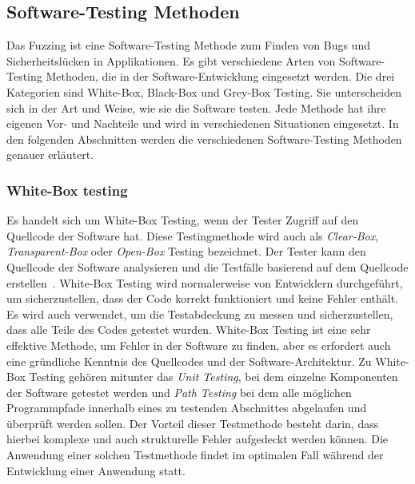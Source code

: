 
\subsection{Software-Testing Methoden}\label{subsec:software-testing-methoden}
Das Fuzzing ist eine Software-Testing Methode zum Finden von Bugs und Sicherheitslücken in Applikationen.
Es gibt verschiedene Arten von Software-Testing Methoden, die in der Software-Entwicklung eingesetzt werden.
Die drei Kategorien sind White-Box, Black-Box und Grey-Box Testing.
Sie unterscheiden sich in der Art und Weise, wie sie die Software testen.
Jede Methode hat ihre eigenen Vor- und Nachteile und wird in verschiedenen Situationen eingesetzt.
In den folgenden Abschnitten werden die verschiedenen Software-Testing Methoden genauer erläutert.
\subsubsection{White-Box testing}\label{subsubsec:white-box-testing}
Es handelt sich um White-Box Testing, wenn der Tester Zugriff auf den Quellcode der Software hat.
Diese Testingmethode wird auch als \textit{Clear-Box}, \textit{Transparent-Box} oder \textit{Open-Box} Testing bezeichnet.
Der Tester kann den Quellcode der Software analysieren und die Testfälle basierend auf dem Quellcode erstellen~\cite{white-box-testing}.
White-Box Testing wird normalerweise von Entwicklern durchgeführt, um sicherzustellen, dass der Code korrekt funktioniert und keine Fehler enthält.
Es wird auch verwendet, um die Testabdeckung zu messen und sicherzustellen, dass alle Teile des Codes getestet wurden.
White-Box Testing ist eine sehr effektive Methode, um Fehler in der Software zu finden,
aber es erfordert auch eine gründliche Kenntnis des Quellcodes und der Software-Architektur.
Zu White-Box Testing gehören mitunter das \textit{Unit Testing}, bei dem einzelne Komponenten der Software getestet werden
und \textit{Path Testing} bei dem alle möglichen Programmpfade innerhalb eines zu testenden Abschnittes abgelaufen und überprüft werden sollen.\newline
Der Vorteil dieser Testmethode besteht darin, dass hierbei komplexe und auch strukturelle Fehler aufgedeckt werden können.
Die Anwendung einer solchen Testmethode findet im optimalen Fall während der Entwicklung einer Anwendung statt.

